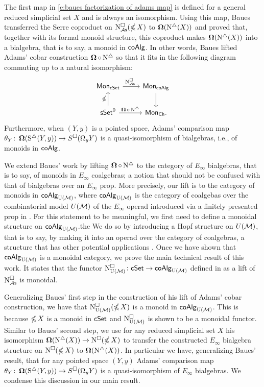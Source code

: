The first map in \eqref{e:baues factorization of adams map} is defined for a general reduced simplicial set $X$ and is always an isomorphism.
Using this map, Baues transferred the Serre coproduct on $\operatorname{N^{\square}_{{\mathcal{A}\mathsf{s}}}}(\operatorname{\mathbb{\Omega}} X)$ to $\operatorname{\mathbf{\Omega}}(\operatorname{N^{\triangle}}(X))$ and proved that, together with its formal monoid structure, this coproduct makes $\operatorname{\mathbf{\Omega}}(\operatorname{N^{\triangle}}(X))$ into a bialgebra, that is to say, a monoid in $\mathsf{coAlg}$.
In other words, Baues lifted Adams' cobar construction $\operatorname{\mathbf{\Omega}} \circ \operatorname{N^{\triangle}}$ so that it fits in the following diagram commuting up to a natural isomorphism:
\begin{equation*}
\begin{tikzcd}
\Mon_{\cSet} \arrow[r, "\cchainsAS \ "] & \Mon_{\coAlg} \arrow[d] \\
\sSet^0 \arrow[r, "\cobar \circ \schains"] \arrow[u, "\ccobar"] & \Mon_{\Ch}.
\end{tikzcd}
\end{equation*}
Furthermore, when $(Y, y)$ is a pointed space, Adams' comparison map $\theta_Y \colon \operatorname{\mathbf{\Omega}}(\operatorname{S^{\triangle}}(Y, y)) \to S^{\square}(\Omega_y Y)$ is a quasi-isomorphism of bialgebras, i.e., of monoids in $\mathsf{coAlg}$.

We extend Baues' work by lifting $\operatorname{\mathbf{\Omega}} \circ \operatorname{N^{\triangle}}$ to the category of $E_\infty$ bialgebras, that is to say, of monoids in $E_\infty$ coalgebras; a notion that should not be confused with that of bialgebras over an $E_\infty$ prop.
More precisely, our lift is to the category of monoids in $\mathsf{coAlg}_{\operatorname{U}(\mathcal{M})}$, where $\mathsf{coAlg}_{\operatorname{U}(\mathcal{M})}$ is the category of coalgebas over the combinatorial model $U(\mathcal{M})$ of the $E_\infty$ operad introduced via a finitely presented prop in \cite{medina2020prop1}.
For this statement to be meaningful, we first need to define a monoidal structure on $\mathsf{coAlg}_{\operatorname{U}(\mathcal{M})}$.the
We do so by introducing a Hopf structure on $U(\mathcal{M})$, that is to say, by making it into an operad over the category of coalgebras, a structure that has other potential applications \cite{livernet2008hopf}.
Once we have shown that $\mathsf{coAlg}_{\operatorname{U}(\mathcal{M})}$ is a monoidal category, we prove the main technical result of this work.
It states that the functor $\operatorname{N^{\square}_{{\operatorname{U}(\mathcal{M})}}} \colon \mathsf{cSet} \to \mathsf{coAlg}_{\operatorname{U}(\mathcal{M})}$ defined in \cite{medina2021cubical} as a lift of $\operatorname{N^{\square}_{{\mathcal{A}\mathsf{s}}}}$ is monoidal.

Generalizing Baues' first step in the construction of his lift of Adams' cobar construction, we have that $\operatorname{N^{\square}_{{\operatorname{U}(\mathcal{M})}}}(\operatorname{\mathbb{\Omega}} X)$ is a monoid in $\mathsf{coAlg}_{\operatorname{U}(\mathcal{M})}$.
This is because $\operatorname{\mathbb{\Omega}} X$ is a monoid in $\mathsf{cSet}$ and $\operatorname{N^{\square}_{{\operatorname{U}(\mathcal{M})}}}$ is shown to be a monoidal functor.
Similar to Baues' second step, we use for any reduced simplicial set $X$ his isomorphism $\operatorname{\mathbf{\Omega}}(\operatorname{N^{\triangle}}(X)) \to \operatorname{N^{\square}}(\operatorname{\mathbb{\Omega}} X)$ to transfer the constructed $E_\infty$ bialgebra structure on $\operatorname{N^{\square}}(\operatorname{\mathbb{\Omega}} X)$ to $\operatorname{\mathbf{\Omega}}(\operatorname{N^{\triangle}}(X))$.
In particular we have, generalizing Baues' result, that for any pointed space $(Y, y)$ Adams' comparison map $\theta_Y \colon \operatorname{\mathbf{\Omega}}(\operatorname{S^{\triangle}}(Y, y)) \to S^{\square}(\Omega_y Y)$ is a quasi-isomorphism of $E_\infty$ bialgebras.
We condense this discussion in our main result.

